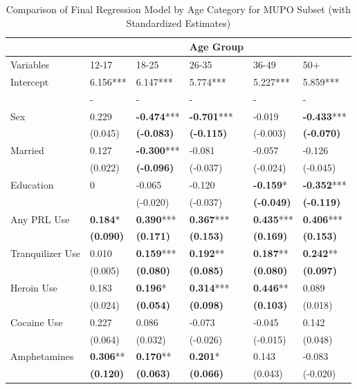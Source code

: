 \documentclass[sigconf]{acmart}
\begin{document}
\begin{table*}[ht]
  \caption{Comparison of Final Regression Model by Age Category for MUPO Subset
  (with Standardized Estimates)}
  \label{tab:freq}
  \begin{tabular}{llllll}
    \toprule
      & & & Age Group& &  \\
    \midrule
    Variables & 12-17& 18-25& 26-35& 36-49& 50+  \\
    \midrule
    Intercept& 6.156***& 6.147***& 5.774***& 5.227***& 5.859*** \\
           & -& -& -& -& - \\
    Sex& 0.229& \textbf{-0.474}***& \textbf{-0.701}***& -0.019& \textbf{-0.433}***  \\
           & (0.045)& \textbf{(-0.083)}& \textbf{(-0.115)}& (-0.003)& \textbf{(-0.070)} \\
    Married& 0.127& \textbf{-0.300}***& -0.081& -0.057& -0.126  \\
           & (0.022)& \textbf{(-0.096)}& (-0.037)& (-0.024)& (-0.045) \\
    Education& 0& -0.065& -0.120& \textbf{-0.159}*& \textbf{-0.352}*** \\
           &        & (-0.020)& (-0.037)& \textbf{(-0.049)}& \textbf{(-0.119)} \\
    Any PRL Use& \textbf{0.184}*& \textbf{0.390}***& \textbf{0.367}***& \textbf{0.435}***& \textbf{0.406}***  \\
           & \textbf{(0.090)}& \textbf{(0.171)}& \textbf{(0.153)}& \textbf{(0.169)}& \textbf{(0.153)} \\
    Tranquilizer Use& 0.010& \textbf{0.159}***& \textbf{0.192}**& \textbf{0.187}**& \textbf{0.242}** \\
           & (0.005)& \textbf{(0.080)}& \textbf{(0.085)}& \textbf{(0.080)}& \textbf{(0.097)} \\
    Heroin Use& 0.183& \textbf{0.196}*& \textbf{0.314}***& \textbf{0.446}**& 0.089  \\
           & (0.024)& \textbf{(0.054)}& \textbf{(0.098)}& \textbf{(0.103)}& (0.018) \\
    Cocaine Use& 0.227& 0.086& -0.073& -0.045& 0.142  \\
           & (0.064)& (0.032)& (-0.026)& (-0.015)& (0.048) \\
    Amphetamines& \textbf{0.306}**& \textbf{0.170}**& \textbf{0.201}*& 0.143& -0.083  \\
           & \textbf{(0.120)}& \textbf{(0.063)}& \textbf{(0.066)}& (0.043)& (-0.020) \\

\end{tabular}
\end{table*}
\end{document}
